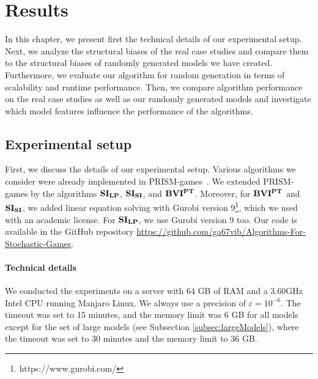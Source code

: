 \chapter{Results} \label{ch:results}

In this chapter, we present first the technical details of our experimental setup.
Next, we analyze the structural biases of the real case studies and compare them to the structural biases of randomly generated models we have created.
Furthermore, we evaluate our algorithm for random generation in terms of scalability and runtime performance.
Then, we compare algorithm performance on the real case studies as well as our randomly generated models and investigate which model features influence the performance of the algorithms.



\section{Experimental setup}
First, we discuss the details of our experimental setup.
Various algorithms we consider were already implemented in PRISM-games~\cite{prismgames3}.
We extended PRISM-games by the algorithms $\mathbf{SI_{LP}}$, $\mathbf{SI_{SI}}$, and $\mathbf{BVI^{PT}}$.
Moreover, for $\mathbf{BVI^{PT}}$ and $\mathbf{SI_{SI}}$, we added linear equation solving with Gurobi version 9\footnote{https://www.gurobi.com/}, which we used with an academic license.
For $\mathbf{SI_{LP}}$, we use Gurobi version 9 too.
Our code is available in the GitHub repository \url{https://github.com/ga67vib/Algorithms-For-Stochastic-Games}.

\subsubsection*{Technical details}
We conducted the experiments on a server with 64 GB of RAM and a 3.60GHz Intel CPU running Manjaro Linux. %
We always use a precision of $\varepsilon=10^{-6}$. 
The timeout was set to 15 minutes, and the memory limit was 6 GB for all models except for the set of large models (see Subsection \ref{subsec:largeModels}),
where the timeout was set to 30 minutes and the memory limit to 36 GB.

